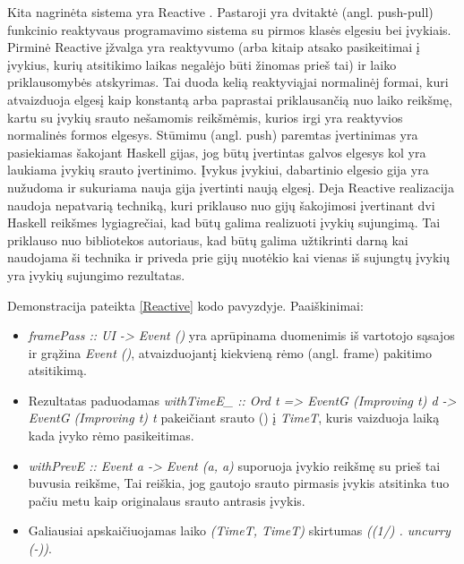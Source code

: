 Kita nagrinėta sistema yra Reactive \cite{Elliott:2009:PFR:1596638.1596643}. Pastaroji yra dvitaktė (angl. push-pull) funkcinio reaktyvaus programavimo sistema su pirmos klasės elgesiu bei įvykiais. Pirminė Reactive įžvalga yra reaktyvumo (arba kitaip atsako pasikeitimai į įvykius, kurių atsitikimo laikas negalėjo būti žinomas prieš tai) ir laiko priklausomybės atskyrimas. Tai duoda kelią reaktyviąjai normalinėj formai, kuri atvaizduoja elgesį kaip konstantą arba paprastai priklausančią nuo laiko reikšmę, kartu su įvykių srauto nešamomis reikšmėmis, kurios irgi yra reaktyvios normalinės formos elgesys. Stūmimu (angl. push) paremtas įvertinimas yra pasiekiamas šakojant Haskell gijas, jog būtų įvertintas galvos elgesys kol yra laukiama įvykių srauto įvertinimo. Įvykus įvykiui, dabartinio elgesio gija yra nužudoma ir sukuriama nauja gija įvertinti naują elgesį. Deja Reactive realizacija naudoja nepatvarią techniką, kuri priklauso nuo gijų šakojimosi įvertinant dvi Haskell reikšmes lygiagrečiai, kad būtų galima realizuoti įvykių sujungimą. Tai priklauso nuo bibliotekos autoriaus, kad būtų galima užtikrinti darną kai naudojama ši technika ir priveda prie gijų nuotėkio kai vienas iš sujungtų įvykių yra įvykių sujungimo rezultatas.


Demonstracija pateikta \ref{Reactive} kodo pavyzdyje. Paaiškinimai:

\begin{itemize}

	\item \textit{framePass :: UI -> Event ()} yra aprūpinama duomenimis iš vartotojo sąsajos ir grąžina \textit{Event ()}, atvaizduojantį kiekvieną rėmo (angl. frame) pakitimo atsitikimą.

	\item Rezultatas paduodamas \textit{withTimeE\_ :: Ord t => EventG (Improving t) d -> EventG (Improving t) t} pakeičiant srauto () į \textit{TimeT}, kuris vaizduoja laiką kada įvyko rėmo pasikeitimas.

	\item \textit{withPrevE :: Event a -> Event (a, a)} suporuoja įvykio reikšmę su prieš tai buvusia reikšme, Tai reiškia, jog gautojo srauto pirmasis įvykis atsitinka tuo pačiu metu kaip originalaus srauto antrasis įvykis.

	\item Galiausiai apskaičiuojamas laiko \textit{(TimeT, TimeT)} skirtumas \textit{((1/) . uncurry (-))}.

\end{itemize}

